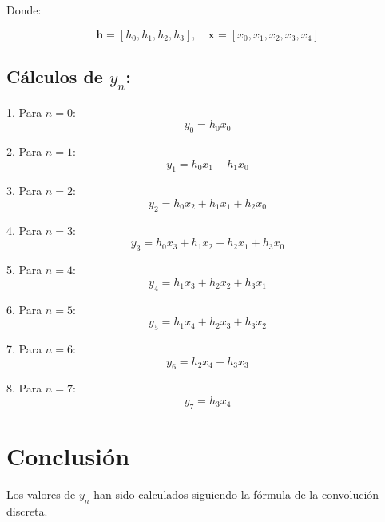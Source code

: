 \documentclass[10pt]{article}
\theoremstyle{definition}
\theoremstyle{remark}
\theoremstyle{definition}
\numberwithin{equation}{prob}
\begin{document}
Donde:

\[
\mathbf{h} = [h_0, h_1, h_2, h_3], \quad \mathbf{x} = [x_0, x_1, x_2, x_3, x_4]
\]

\subsection*{Cálculos de $y_n$:}

1. Para $n = 0$:
   \[
   y_0 = h_0 x_0
   \]

2. Para $n = 1$:
   \[
   y_1 = h_0 x_1 + h_1 x_0
   \]

3. Para $n = 2$:
   \[
   y_2 = h_0 x_2 + h_1 x_1 + h_2 x_0
   \]

4. Para $n = 3$:
   \[
   y_3 = h_0 x_3 + h_1 x_2 + h_2 x_1 + h_3 x_0
   \]

5. Para $n = 4$:
   \[
   y_4 = h_1 x_3 + h_2 x_2 + h_3 x_1
   \]

6. Para $n = 5$:
   \[
   y_5 = h_1 x_4 + h_2 x_3 + h_3 x_2
   \]

7. Para $n = 6$:
   \[
   y_6 = h_2 x_4 + h_3 x_3
   \]

8. Para $n = 7$:
   \[
   y_7 = h_3 x_4
   \]

\section*{Conclusión}

Los valores de $y_n$ han sido calculados siguiendo la fórmula de la convolución discreta.
\end{document}
